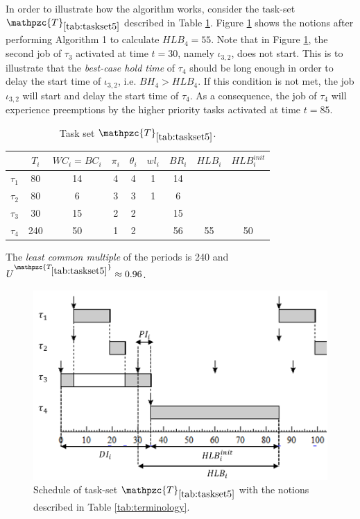 \documentclass[fleqn]{article}
\begin{document}
In order to illustrate how the algorithm works, consider the task-set $\mathpzc{T}_{\ref{tab:taskset5}}$ described in Table \ref{tab:taskset5}. Figure \ref{fig:bcht_1} shows the notions after performing Algorithm 1 to calculate $HLB_4=55$. Note that in Figure \ref{fig:bcht_1}, the second job of $\tau_3$ activated at time $t=30$, namely $\iota_{3,2}$, does not start. This is to illustrate that the \textit{best-case hold time} of $\tau_4$ should be long enough in order to delay the start time of $\iota_{3,2}$, i.e. $BH_4 > HLB_4$. If this condition is not met, the job $\iota_{3,2}$ will start and delay the start time of $\tau_4$. As a consequence, the job of $\tau_4$ will experience preemptions by the higher priority tasks activated at time $t=85$.

\begin{table}[H]
	\center
	\caption{Task set $\mathpzc{T}_{\ref{tab:taskset5}}$.}
	\label{tab:taskset5}
	\begin{tabular}{c c c c c | c c c c}
		\hline 
		& $T_i$ & $WC_i=BC_i$ & $\pi_i$ & $\theta_i$ &  $wl_i$ & $BR_i$ & $HLB_i$ & $HLB^{init}_i$\\ 
		\hline 
		$\tau_1$& 80  & 14  & 4 & 4 &  1 & 14 & &\\
		$\tau_2$& 80  & 6   & 3 & 3 &  1 & 6  & &\\ 
		$\tau_3$& 30  & 15  & 2 & 2 &   & 15  & &\\ 
		$\tau_4$& 240 & 50  & 1 & 2 &   & 56  & 55& 50\\
		\hline 
	\end{tabular}
	\small
	\item The \textit{least common multiple} of the periods is 240 and $U^{\mathpzc{T_{\ref{tab:taskset5}}}} \approx 0.96$.
\end{table}

\begin{figure}[H]
	\centering
	\includegraphics[width=0.7\linewidth]{figures/bcht_1}
	\caption{Schedule of task-set $\mathpzc{T}_{\ref{tab:taskset5}}$ with the notions described in Table \ref{tab:terminology}.}
	\label{fig:bcht_1}
\end{figure}
\end{document}
